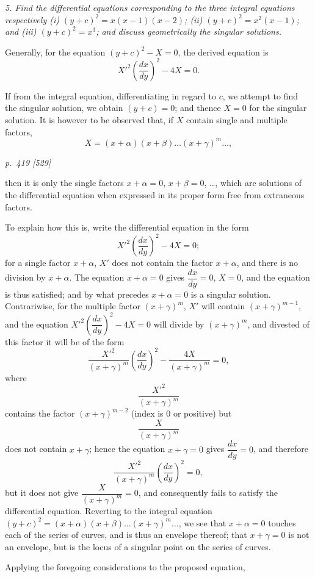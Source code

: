 \documentclass[11pt,a4paper]{article}
\theoremstyle{plain}
\theoremstyle{definition}
\begin{document}
\textit{5. Find the differential equations corresponding to the three integral equations respectively (i) $(y+c)^2=x(x-1)(x-2)$; (ii) $(y+c)^2=x^2(x-1)$; and (iii) $(y+c)^2=x^3$; and discuss geometrically the singular solutions.}

Generally, for the equation $(y+c)^2-X=0$, the derived equation is
\[
X'^2\left(\frac{dx}{dy}\right)^2-4X=0.
\]

If from the integral equation, differentiating in regard to $c$, we attempt to find the singular solution, we obtain $(y+c)=0$; and thence $X=0$ for the singular solution. It is however to be observed that, if $X$ contain single and multiple factors,
\[
X=(x+\alpha)(x+\beta)\ldots (x+\gamma)^m\ldots ,
\]

\clearpage

\bigskip
\textit{p.~419 [529]}
\smallskip

then it is only the single factors $x+\alpha=0$, $x+\beta=0$, \ldots, which are solutions of the differential equation when expressed in its proper form free from extraneous factors.

To explain how this is, write the differential equation in the form
\[
X'^2\left(\frac{dx}{dy}\right)^2-4X=0;
\]
for a single factor $x+\alpha$, $X'$ does not contain the factor $x+\alpha$, and there is no division by $x+\alpha$. The equation $x+\alpha=0$ gives $\dfrac{dx}{dy}=0$, $X=0$, and the equation is thus satisfied; and by what precedes $x+\alpha=0$ is a singular solution. Contrariwise, for the multiple factor $(x+\gamma)^m$, $X'$ will contain $(x+\gamma)^{m-1}$, and the equation $X'^2\left(\dfrac{dx}{dy}\right)^2-4X=0$ will divide by $(x+\gamma)^m$, and divested of this factor it will be of the form
\[
\frac{X'^2}{(x+\gamma)^m}\left(\frac{dx}{dy}\right)^2-\frac{4X}{(x+\gamma)^m}=0,
\]
where
\[
\frac{X'^2}{(x+\gamma)^m}
\]
contains the factor $(x+\gamma)^{m-2}$ (index is 0 or positive) but
\[
\frac{X}{(x+\gamma)^m}
\]
does not contain $x+\gamma$; hence the equation $x+\gamma=0$ gives $\dfrac{dx}{dy}=0$, and therefore
\[
\frac{X'^2}{(x+\gamma)^m}\left(\frac{dx}{dy}\right)^2=0,
\]
but it does not give $\dfrac{X}{(x+\gamma)^m}=0$, and consequently fails to satisfy the differential equation. Reverting to the integral equation $(y+c)^2=(x+\alpha)(x+\beta)\ldots (x+\gamma)^m\ldots$, we see that $x+\alpha=0$ touches each of the series of curves, and is thus an envelope thereof; that $x+\gamma=0$ is not an envelope, but is the locus of a singular point on the series of curves.

Applying the foregoing considerations to the proposed equation,
\end{document}
